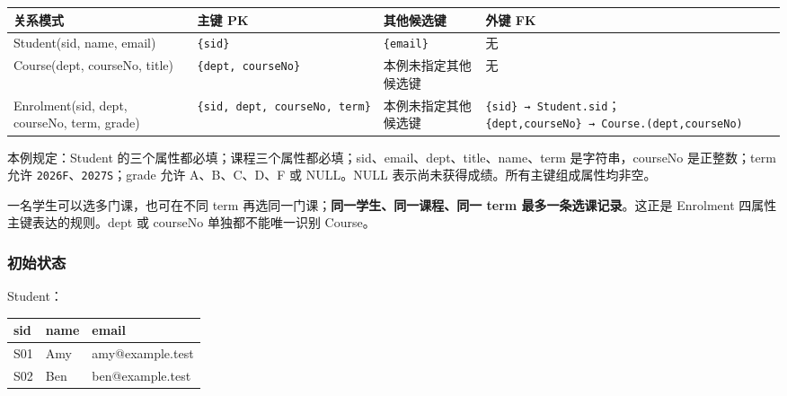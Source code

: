 \begin{longtable}[]{@{}
  >{\raggedright\arraybackslash}p{}
  >{\raggedright\arraybackslash}p{}
  >{\raggedright\arraybackslash}p{}
  >{\raggedright\arraybackslash}p{}@{}}
\toprule\noalign{}
\begin{minipage}[b]{\linewidth}\raggedright
关系模式
\end{minipage} & \begin{minipage}[b]{\linewidth}\raggedright
主键 PK
\end{minipage} & \begin{minipage}[b]{\linewidth}\raggedright
其他候选键
\end{minipage} & \begin{minipage}[b]{\linewidth}\raggedright
外键 FK
\end{minipage} \\
\midrule\noalign{}
\endhead
\bottomrule\noalign{}
\endlastfoot
Student(sid, name, email) & \texttt{\{sid\}} & \texttt{\{email\}} & 无 \\
Course(dept, courseNo, title) & \texttt{\{dept,\ courseNo\}} & 本例未指定其他候选键 & 无 \\
Enrolment(sid, dept, courseNo, term, grade) & \texttt{\{sid,\ dept,\ courseNo,\ term\}} & 本例未指定其他候选键 & \texttt{\{sid\}\ →\ Student.sid}；\texttt{\{dept,courseNo\}\ →\ Course.\allowbreak{}(dept,\allowbreak{}courseNo)} \\
\end{longtable}

本例规定：Student 的三个属性都必填；课程三个属性都必填；sid、email、dept、title、name、term 是字符串，courseNo 是正整数；term 允许 \texttt{2026F}、\texttt{2027S}；grade 允许 A、B、C、D、F 或 NULL。NULL 表示尚未获得成绩。所有主键组成属性均非空。

一名学生可以选多门课，也可在不同 term 再选同一门课；\textbf{同一学生、同一课程、同一 term 最多一条选课记录}。这正是 Enrolment 四属性主键表达的规则。dept 或 courseNo 单独都不能唯一识别 Course。

\subsubsection{初始状态}\label{03_relational_model_and_integrity_zh-ux521dux59cbux72b6ux6001}

Student：

\begin{longtable}[]{@{}lll@{}}
\toprule\noalign{}
sid & name & email \\
\midrule\noalign{}
\endhead
\bottomrule\noalign{}
\endlastfoot
S01 & Amy & amy@example.test \\
S02 & Ben & ben@example.test \\
\end{longtable}

